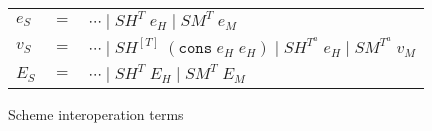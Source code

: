 \begin{figure}
\begin{center}
\begin{tabular}{lcl}
$e_{S}$ & $=$ & $\cdots\;\vert\;SH^{T}\;e_{H}\;\vert\;SM^{T}\;e_{M}$ \\
$v_{S}$ & $=$ & $\cdots\;\vert\;SH^{[T]}\;(\mathtt{cons}\;e_{H}\;e_{H})\;\vert\;SH^{T^{a}}\;e_{H}\;\vert\;SM^{T^{a}}\;v_{M}$ \\
$E_{S}$ & $=$ & $\cdots\;\vert\;SH^{T}\;E_{H}\;\vert\;SM^{T}\;E_{M}$
\end{tabular}
\end{center}
\caption{Scheme interoperation terms}
\label{fig:sit}
\end{figure}